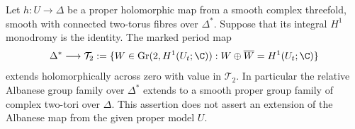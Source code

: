 \begin{proposition}\hypertarget{tag-01GD}{}\label{cdp:st:D.2.6}


Let $h:U\to\Delta$ be a proper holomorphic map from a smooth
complex threefold, smooth with connected two-torus fibres over
$\Delta^*$. Suppose that its integral $H^1$ monodromy is the
identity. The marked period map
\[
 \Delta^*\longrightarrow
 \mathcal T_2
 :=\{W\in\operatorname{Gr}(2,H^1(U_t;\C)):
                   W\oplus\overline W=H^1(U_t;\C)\}
\]
extends holomorphically across zero with value in $\mathcal T_2$.
In particular the relative Albanese group family over $\Delta^*$
extends to a smooth proper group family of complex two-tori over
$\Delta$. This assertion does not assert an extension of the
Albanese map from the given proper model $U$.
\end{proposition}


